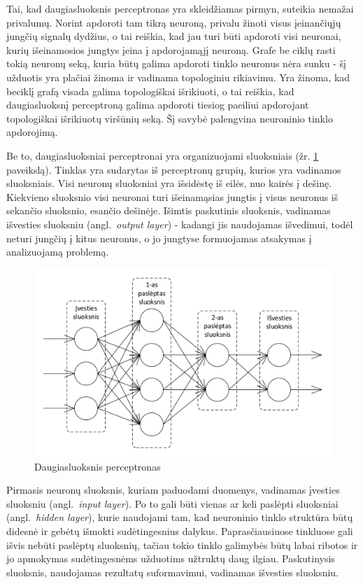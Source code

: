 \documentclass{VUMIFPSbakalaurinis}
\begin{document}
Tai, kad daugiasluoksnis perceptronas yra skleidžiamas pirmyn, suteikia nemažai privalumų.
Norint apdoroti tam tikrą neuroną, privalu žinoti visus įeinančiųjų jungčių signalų dydžius, o tai reiškia, kad jau turi būti apdoroti visi neuronai, kurių išeinamosios jungtys įeina į apdorojamąjį neuroną.
Grafe be ciklų rasti tokią neuronų seką, kuria būtų galima apdoroti tinklo neuronus nėra sunku - šį užduotis yra plačiai žinoma ir vadinama topologiniu rikiavimu.
Yra žinoma, kad beciklį grafą visada galima topologiškai išrikiuoti, o tai reiškia, kad daugiasluoksnį perceptroną galima apdoroti tiesiog paeiliui apdorojant topologiškai išrikiuotų viršūnių seką.
Šį savybė palengvina neuroninio tinklo apdorojimą.

Be to, daugiasluoksniai perceptronai yra organizuojami sluoksniais (žr. \ref{fig:neural_network} paveikslą).
Tinklas yra sudarytas iš perceptronų grupių, kurios yra vadinamos sluoksniais.
Visi neuronų sluoksniai yra išsidėstę iš eilės, nuo kairės į dešinę.
Kiekvieno sluoksnio visi neuronai turi išeinamąsias jungtis į visus neuronus iš sekančio sluoksnio, esančio dešinėje.
Išimtis paskutinis sluoksnis, vadinamas išvesties sluoksniu (angl.~\textit{output layer}) - kadangi jis naudojamas išvedimui, todėl neturi jungčių į kitus neuronus, o jo jungtyse formuojamas atsakymas į analizuojamą problemą.

\begin{figure}[h]
	\centering
	\includegraphics[scale=0.75]{diagrams/2_neural_network}
	\caption{Daugiasluoksnis perceptronas}
	\label{fig:neural_network}
\end{figure}

Pirmasis neuronų sluoksnis, kuriam paduodami duomenys, vadinamas įvesties sluoksniu (angl.~\textit{input layer}).
Po to gali būti vienas ar keli paslėpti sluoksniai (angl.~\textit{hidden layer}), kurie naudojami tam, kad neuroninio tinklo struktūra būtų didesnė ir gebėtų išmokti sudėtingesnius dalykus.
Paprasčiausiuose tinkluose gali išvis nebūti paslėptų sluoksnių, tačiau tokio tinklo galimybės būtų labai ribotos ir jo apmokymas sudėtingesnėms užduotims užtruktų daug ilgiau.
Paskutinysis sluoksnis, naudojamas rezultatų suformavimui, vadinamas išvesties sluoksniu.
\end{document}
